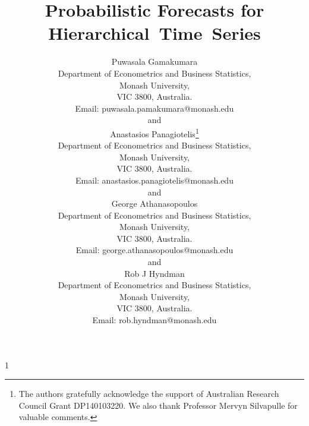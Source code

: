 \documentclass[12pt]{article}
\newcommand{\blind}{1}
\theoremstyle{definition}
\begin{document}
	
	\def\spacingset#1{\renewcommand{\baselinestretch}%
		{#1}\small\normalsize} \spacingset{1}
	
	
	
	\blind
	{
		\title{\bf Probabilistic Forecasts for Hierarchical~Time~Series}
		        \author{Puwasala Gamakumara\\
			    Department of Econometrics and Business Statistics,\\
			    Monash University,\\ VIC 3800, Australia.\\
			    Email: puwasala.pamakumara@monash.edu \\
			    and \\
			    Anastasios Panagiotelis\thanks{
			    	The authors gratefully acknowledge the support of Australian Research Council Grant DP140103220.  We also thank Professor Mervyn Silvapulle for valuable comments.}\hspace{.2cm}\\
			    Department of Econometrics and Business Statistics,\\
		    	Monash University,\\ VIC 3800, Australia.\\
			    Email: anastasios.panagiotelis@monash.edu \\
			    and \\
		        George Athanasopoulos\\
		        Department of Econometrics and Business Statistics,\\
		        Monash University,\\ VIC 3800, Australia.\\
		        Email: george.athanasopoulos@monash.edu \\
		        and \\
	            Rob J Hyndman\\
	            Department of Econometrics and Business Statistics,\\
	            Monash University,\\ VIC 3800, Australia.\\
	            Email: rob.hyndman@monash.edu \\}
		\maketitle
	} \fi
	
\end{document}
